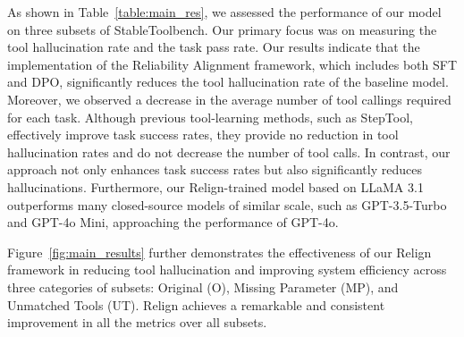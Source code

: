 As shown in Table~\ref{table:main_res}, we assessed the performance of our model on three subsets of StableToolbench. Our primary focus was on measuring the tool hallucination rate and the task pass rate. Our results indicate that the implementation of the Reliability Alignment framework, which includes both SFT and DPO, significantly reduces the tool hallucination rate of the baseline model. Moreover, we observed a decrease in the average number of tool callings required for each task. Although previous tool-learning methods, such as StepTool, effectively improve task success rates, they provide no reduction in tool hallucination rates and do not decrease the number of tool calls. In contrast, our approach not only enhances task success rates but also significantly reduces hallucinations. Furthermore, our Relign-trained model based on LLaMA 3.1 outperforms many closed-source models of similar scale, such as GPT-3.5-Turbo and GPT-4o Mini, approaching the performance of GPT-4o.


Figure~\ref{fig:main_results} further demonstrates the effectiveness of our Relign framework in reducing tool hallucination and improving system efficiency across three categories of subsets: Original (O), Missing Parameter (MP), and Unmatched Tools (UT). Relign achieves a remarkable and consistent improvement in all the metrics over all subsets. 



